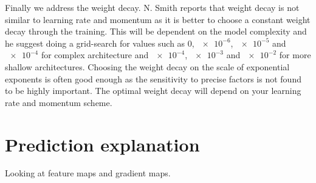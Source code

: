 Finally we address the weight decay. N. Smith reports that weight decay is not similar to learning rate and momentum as it is better to choose a constant weight decay through the training. This will be dependent on the model complexity and he suggest doing a grid-search for values such as 0, $\num{e-6}$, $\num{e-5}$ and $\num{e-4}$ for complex architecture and $\num{e-4}$, $\num{e-3}$ and $\num{e-2}$ for more shallow architectures. Choosing the weight decay on the scale of exponential exponents is often good enough as the sensitivity to precise factors is not found to be highly important. The optimal weight decay will depend on your learning rate and momentum scheme.













\section{Prediction explanation}
Looking at feature maps and gradient maps.



